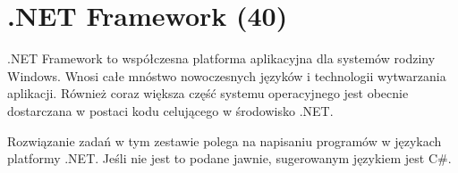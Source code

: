 ﻿\chapter{.NET Framework (40)}

.NET Framework to współczesna platforma aplikacyjna dla systemów rodziny Windows. Wnosi całe mnóstwo nowoczesnych języków i technologii wytwarzania aplikacji. 
Również coraz większa część systemu operacyjnego jest obecnie dostarczana w postaci kodu celującego w środowisko .NET.

Rozwiązanie zadań w tym zestawie polega na napisaniu programów w językach platformy .NET. 
Jeśli nie jest to podane jawnie, sugerowanym językiem jest C\#. 

 
 
 
 
 
